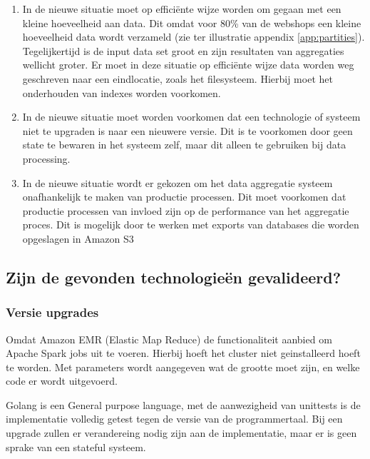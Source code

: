 \begin{enumerate}[label=(\alph*)]
    \item In de nieuwe situatie moet op efficiënte wijze worden om gegaan met een kleine hoeveelheid aan data. Dit omdat voor 80\% van de webshops een kleine hoeveelheid data wordt verzameld (zie ter illustratie appendix \ref{app:partities}). Tegelijkertijd is de input data set groot en zijn resultaten van aggregaties wellicht groter. Er moet in deze situatie op efficiënte wijze data worden weg geschreven naar een eindlocatie,  zoals het filesysteem. Hierbij moet het onderhouden van indexes worden voorkomen.
    
    \item In de nieuwe situatie moet worden voorkomen dat een technologie of systeem niet te upgraden is naar een nieuwere versie. Dit is te voorkomen door geen state te bewaren in het systeem zelf, maar dit alleen te gebruiken bij data processing.
    
    \item In de nieuwe situatie wordt er gekozen om het data aggregatie systeem onafhankelijk te maken van productie processen. Dit moet voorkomen dat productie processen van invloed zijn op de performance van het aggregatie proces. Dit is mogelijk door te werken met exports van databases die worden opgeslagen in Amazon S3
\end{enumerate}

\clearpage


\subsection{Zijn de gevonden technologieën gevalideerd?}
\label{subsec:deelvraag3_vergelijking}

\subsubsection{\textbf{Versie upgrades}}

Omdat Amazon  EMR (Elastic Map Reduce) de functionaliteit aanbied om Apache Spark jobs uit te voeren. Hierbij hoeft het cluster niet geinstalleerd hoeft te worden. Met parameters wordt aangegeven wat de grootte moet zijn, en welke code er wordt uitgevoerd. 

Golang is een General purpose language, met de aanwezigheid van unittests is de implementatie volledig getest tegen de versie van de programmertaal. Bij een upgrade zullen er verandereing nodig zijn aan de implementatie, maar er is geen sprake van een stateful systeem.

